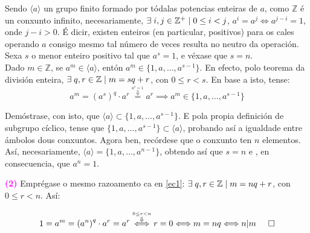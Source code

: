 \documentclass[twoside]{report}
\newcommand{\magbf}[1]{\textcolor{magenta}{\textbf{#1}}} %
\theoremstyle{mystyle}
\begin{document}
\noindent Sendo $\langle a \rangle$ un grupo finito formado por tódalas potencias enteiras de $a$, como $\mathbb{Z}$ é un conxunto infinito, necesariamente, $\exists \hspace{1mm} i,j \in \mathbb{Z}^{+} \hspace{1mm} | \hspace{1mm} 0 \leq i < j$, $a^{i} = a^{j} \Longleftrightarrow a^{j-i} = 1$, onde $j-i > 0$. É dicir, existen enteiros (en particular, positivos) para os cales operando $a$ consigo mesmo tal número de veces resulta no neutro da operación. Sexa $s$ o menor enteiro positivo tal que $a^{s} = 1$, e véxase que $s = n$. \\

\noindent Dado $m \in \mathbb{Z}$, se $a^{m} \in \langle a \rangle$, entón $a^{m} \in \{1,a,\dots,a^{s-1}\}$. En efecto, polo teorema da división enteira, $\exists \hspace{1mm} q,r \in \mathbb{Z} \hspace{1mm} | \hspace{1mm} m = sq + r$, con $0 \leq r < s$. En base a isto, tense:
\begin{equation}\label{ec1}
    a^{m} = {(a^{s})}^{q} \cdot a^{r} \overset{\overset{a^{s} = 1}{\Downarrow}}{=} a^{r} \implies a^{m} \in \{1,a,\dots,a^{s-1}\}
\end{equation}

\noindent Demóstrase, con isto, que $\langle a \rangle \subset \{1,a,\dots,a^{s-1}\}$. E pola propia definición de subgrupo cíclico, tense que $\{1,a,\dots,a^{s-1}\} \subset \langle a \rangle$, probando así a igualdade entre ámbolos dous conxuntos. Agora ben, recórdese que o conxunto ten $n$ elementos. Así, necesariamente, $\langle a \rangle = \{1,a,\dots,a^{n-1}\}$, obtendo así que $s = n$ e , en consecuencia, que $a^{n} = 1$. 

\hspace{2mm}

\noindent \magbf{(2)} Emprégase o mesmo razoamento ca en \eqref{ec1}: $\exists \hspace{1mm} q,r \in \mathbb{Z} \hspace{1mm} | \hspace{1mm} m = nq + r$, con $0 \leq r < n$. Así:

$$1 = a^{m} = {(a^{n})}^{q} \cdot a^{r} = a^{r} \overset{\overset{0 \leq r < n}{\Downarrow}}{\Longleftrightarrow} r = 0 \Longleftrightarrow m = nq \Longleftrightarrow n|m \hspace{5mm}\square$$ 
\end{document}

